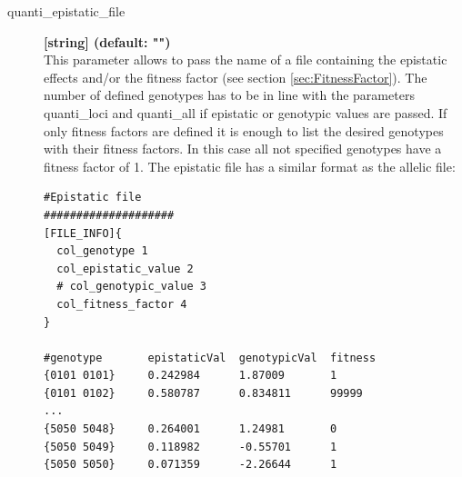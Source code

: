 \documentclass[letterpaper,12pt,oneside]{book}
\begin{document}
\begin{description}
\item[quanti\_epistatic\_file] \textbf{[string] (default: "")}\\
This parameter allows to pass the name of a file containing the epistatic effects and/or the fitness factor (see section \ref{sec:FitnessFactor}). The number of defined genotypes has to be in line with the parameters \textsf{quanti\_loci} and \textsf{quanti\_all} if epistatic or genotypic values are passed. If only fitness factors are defined it is enough to list the desired genotypes with their fitness factors. In this case all not specified genotypes have a fitness factor of 1. The epistatic file has a similar format as the allelic file:

\begin{lstlisting}[frame=single]
#Epistatic file 
####################
[FILE_INFO]{
  col_genotype 1
  col_epistatic_value 2
  # col_genotypic_value 3
  col_fitness_factor 4
}

#genotype       epistaticVal  genotypicVal  fitness
{0101 0101}     0.242984      1.87009       1    
{0101 0102}     0.580787      0.834811      99999   
...
{5050 5048}     0.264001      1.24981       0
{5050 5049}     0.118982      -0.55701      1
{5050 5050}     0.071359      -2.26644      1
\end{lstlisting}


\end{description}
\end{document}
